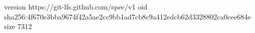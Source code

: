 version https://git-lfs.github.com/spec/v1
oid sha256:4f670e3bba9674f42a5ae2cc9bb1ad7cb8c9a412edcb62d3328802ca0cee684e
size 7312
